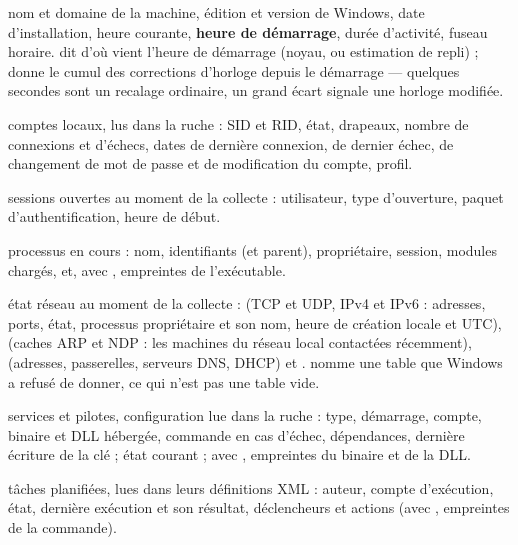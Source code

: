 \documentclass[11pt,a4paper,oneside]{report}
\begin{document}
\begin{description}[style=nextline,leftmargin=1.2em]
  \item[\fichier{OperatingSystem.json}] nom et domaine de la machine, édition et
        version de Windows, date d'installation, heure courante, \textbf{heure de
        démarrage}, durée d'activité, fuseau horaire.
         dit d'où vient l'heure de démarrage (noyau, ou
        estimation de repli) ;  donne le cumul des
        corrections d'horloge depuis le démarrage — quelques secondes sont un
        recalage ordinaire, un grand écart signale une horloge modifiée.
  \item[\fichier{users.json}] comptes locaux, lus dans la ruche  :
        SID et RID, état, drapeaux, nombre de connexions et d'échecs, dates de
        dernière connexion, de dernier échec, de changement de mot de passe et de
        modification du compte, profil.
  \item[\fichier{Sessions.json}] sessions ouvertes au moment de la collecte :
        utilisateur, type d'ouverture, paquet d'authentification, heure de début.
  \item[\fichier{processes.json}] processus en cours : nom, identifiants (et
        parent), propriétaire, session, modules chargés, et, avec ,
        empreintes de l'exécutable.
  \item[\fichier{network.json}] état réseau au moment de la collecte :
         (TCP et UDP, IPv4 et IPv6 : adresses, ports, état,
        processus propriétaire et son nom, heure de création locale et UTC),
         (caches ARP et NDP : les machines du réseau local
        contactées récemment),  (adresses, passerelles,
        serveurs DNS, DHCP) et .  nomme une
        table que Windows a refusé de donner, ce qui n'est pas une table vide.
  \item[\fichier{services.json}] services et pilotes, configuration lue dans la
        ruche : type, démarrage, compte, binaire et DLL hébergée, commande en cas
        d'échec, dépendances, dernière écriture de la clé ; état courant ; avec
        , empreintes du binaire et de la DLL.
  \item[\fichier{ScheduledTasks.json}] tâches planifiées, lues dans leurs
        définitions XML : auteur, compte d'exécution, état, dernière exécution et
        son résultat, déclencheurs et actions (avec , empreintes de la
        commande).
\end{description}
\end{document}
